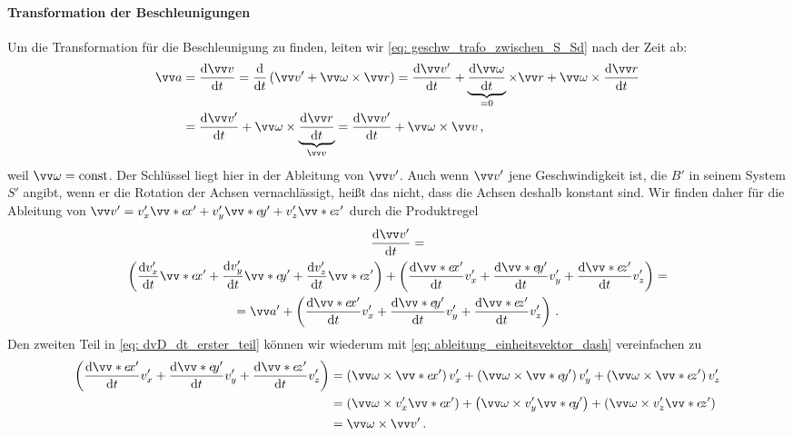 \paragraph{Transformation der Beschleunigungen}
Um die Transformation für die Beschleunigung zu finden, leiten wir \cref{eq: geschw_trafo_zwischen_S_Sd} nach der Zeit ab:
\begin{equation}\label{eq: beschleunigung_ableitung_von_v_coriolis}\begin{aligned}
    \ivec{a} &= \frac{\dd\ivec{v}}{\dd t} = \frac{\dd}{\dd t} \left(\ivec{v}' + \ivec{\omega} \times \ivec{r} \right) = \frac{\dd\ivec{v}'}{\dd t} + \underbrace{\frac{\dd\ivec{\omega}}{\dd t}}_{=0} \times \ivec{r} + \ivec{\omega} \times \frac{\dd\ivec{r}}{\dd t} \\
    &= \frac{\dd\ivec{v}'}{\dd t} + \ivec{\omega} \times \underbrace{\frac{\dd\ivec{r}}{\dd t}}_{\ivec{v}} = \frac{\dd\ivec{v}'}{\dd t} + \ivec{\omega} \times \ivec{v} \mComma
\end{aligned}\end{equation} 
weil $\ivec{\omega} = \const$. Der Schlüssel liegt hier in der Ableitung von $\ivec{v}'$. Auch wenn $\ivec{v}'$ jene Geschwindigkeit ist, die $B'$ in seinem System $S'$ angibt, wenn er die Rotation der Achsen vernachlässigt, heißt das nicht, dass die Achsen deshalb konstant sind. Wir finden daher für die Ableitung von $\ivec{v}' = v_x'\ivecS{e}{x}' + v_y'\ivecS{e}{y}' + v_z'\ivecS{e}{z}'$ durch die Produktregel
\begin{multline}\label{eq: dvD_dt_erster_teil}
    \frac{\dd\ivec{v}'}{\dd t} = \\
    \left( \frac{\dd v_x'}{\dd t} \ivecS{e}{x}' + \frac{\dd v_y'}{\dd t} \ivecS{e}{y}' + \frac{\dd v_z'}{\dd t} \ivecS{e}{z}'\right) + \left( \frac{\dd \ivecS{e}{x}'}{\dd t} v_x' + \frac{\dd \ivecS{e}{y}'}{\dd t} v_y' + \frac{\dd \ivecS{e}{z}'}{\dd t} v_z' \right)  = \\
    = \ivec{a}' + \left( \frac{\dd \ivecS{e}{x}'}{\dd t} v_x' + \frac{\dd \ivecS{e}{y}'}{\dd t} v_y' + \frac{\dd \ivecS{e}{z}'}{\dd t} v_z' \right) \mDot
\end{multline}
Den zweiten Teil in \cref{eq: dvD_dt_erster_teil} können wir wiederum mit \cref{eq: ableitung_einheitsvektor_dash} vereinfachen zu 
\begin{equation}\label{eq: zweiter_anteil_dvD_dt}\begin{aligned}
    \left( \frac{\dd \ivecS{e}{x}'}{\dd t} v_x' + \frac{\dd \ivecS{e}{y}'}{\dd t} v_y' + \frac{\dd \ivecS{e}{z}'}{\dd t} v_z' \right) &= \left( \ivec{\omega} \times \ivecS{e}{x}' \right) v_x' + \left( \ivec{\omega} \times \ivecS{e}{y}' \right) v_y' + \left( \ivec{\omega} \times \ivecS{e}{z}' \right) v_z' \\
    &= \left(\ivec{\omega} \times v_x' \ivecS{e}{x}'\right) + \left(\ivec{\omega} \times v_y' \ivecS{e}{y}'\right) + \left(\ivec{\omega} \times v_z' \ivecS{e}{z}'\right) \\
    &= \ivec{\omega} \times \ivec{v}' \mDot
\end{aligned}\end{equation}

